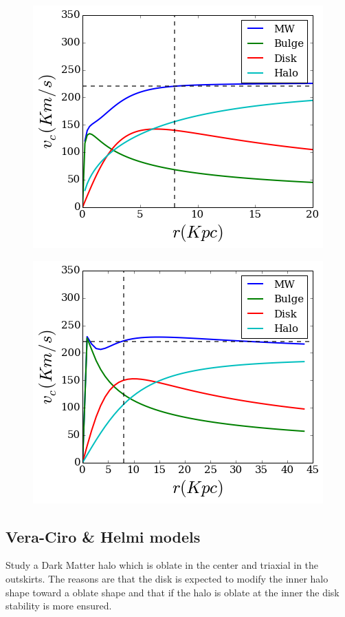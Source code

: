 \begin{figure}[H]\label{MWBesla07}
\centering
\includegraphics[scale=0.7]{../figures/MWBEsla07.png}
\end{figure}



\begin{figure}[H]\label{MWLM10}
\centering
\includegraphics[scale=0.7]{../figures/MWLM10.png}
\end{figure}

\subsection{Vera-Ciro \& Helmi models}

\citep{Vera13} Study a Dark Matter halo which is oblate in the center
and triaxial in the outskirts. The reasons are that the disk is expected
to modify the inner halo shape toward a oblate shape and that if the 
halo is oblate at the inner the disk stability is more ensured. 

